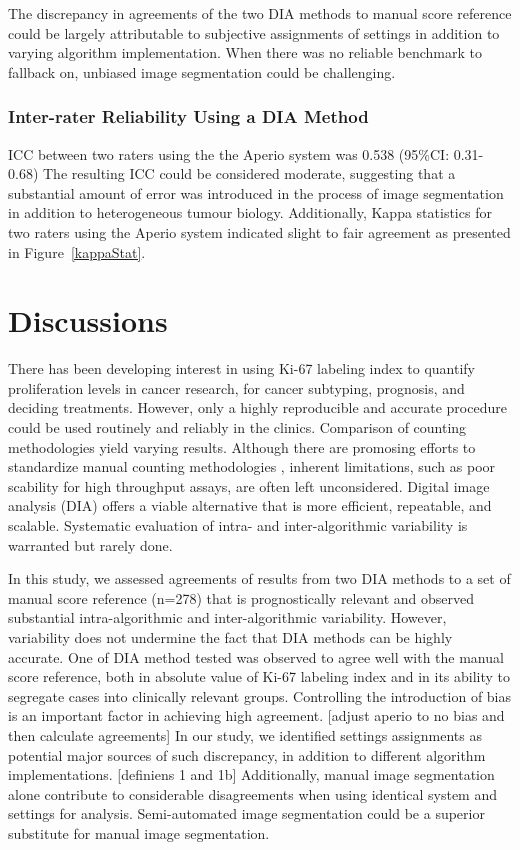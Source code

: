 \documentclass[final,5p,times,twocolumn]{elsarticle}
\begin{document}
The discrepancy in agreements of the two DIA methods to manual score reference could be largely attributable to subjective assignments of settings in addition to varying algorithm implementation. When there was no reliable benchmark to fallback on, unbiased image segmentation could be challenging.

\subsubsection*{Inter-rater Reliability Using a DIA Method}
ICC between two raters using the the Aperio system was 0.538 (95\%CI: 0.31-0.68) The resulting ICC could be considered moderate, suggesting that a substantial amount of error was introduced in the process of image segmentation in addition to heterogeneous tumour biology. \cite{Cicchetti1994} Additionally, Kappa statistics for two raters using the Aperio system indicated slight to fair agreement as presented in Figure~\ref{kappaStat}. \cite{Landis1977}


\section*{Discussions}

There has been developing interest in using Ki-67 labeling index to quantify proliferation levels in cancer research, for cancer subtyping, prognosis, and deciding treatments. However, only a highly reproducible and accurate procedure could be used routinely and reliably in the clinics. Comparison of counting methodologies yield varying results. \cite{Mikami2013, Reid2015} Although there are promosing efforts to standardize manual counting methodologies \cite{Polley2013a, Polley2015}, inherent limitations, such as poor scability for high throughput assays, are often left unconsidered. Digital image analysis (DIA) offers a viable alternative that is more efficient, repeatable, and scalable. Systematic evaluation of intra- and inter-algorithmic variability is warranted but rarely done.

In this study, we assessed agreements of results from two DIA methods to a set of manual score reference (n=278) that is prognostically relevant and observed substantial intra-algorithmic and inter-algorithmic variability. However, variability does not undermine the fact that DIA methods can be highly accurate. One of DIA method tested was observed to agree well with the manual score reference, both in absolute value of Ki-67 labeling index and in its ability to segregate cases into clinically relevant groups. Controlling the introduction of bias is an important factor in achieving high agreement. [adjust aperio to no bias and then calculate agreements] In our study, we identified settings assignments as potential major sources of such discrepancy, in addition to different algorithm implementations. [definiens 1 and 1b] Additionally, manual image segmentation alone contribute to considerable disagreements when using identical system and settings for analysis. Semi-automated image segmentation could be a superior substitute for manual image segmentation.
\end{document}
